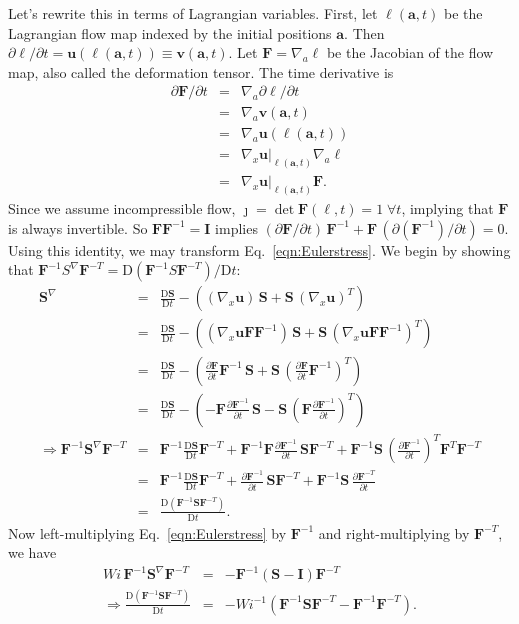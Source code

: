 \documentclass[12pt]{article}
\newcommand{\baas}[1]{\begin{eqnarray*} #1 \end{eqnarray*}}
\newcommand{\pd}[2]{\ensuremath{\frac{\partial #1}{\partial #2}}}
\newcommand{\ba}{{\mathbf a}}
\newcommand{\bl}{{\pmb \ell}}
\newcommand{\bu}{{\mathbf u}}
\newcommand{\bv}{{\mathbf v}}
\newcommand{\bS}{{\mathbf S}}
\newcommand{\bI}{{\mathbf I}}
\newcommand{\bF}{{\mathbf F}}
\begin{document}
	Let's rewrite this in terms of Lagrangian variables. First, let $\bl(\ba,t)$ be the Lagrangian flow map indexed by the initial positions $\ba$. Then $\partial\bl/\partial t=\bu(\bl(\ba,t)) \equiv \bv(\ba,t)$. Let $\bF = \nabla_a \bl$ be the Jacobian of the flow map, also called the deformation tensor. The time derivative is 
	\baas{
	\partial \bF/\partial t &=& \nabla_a \partial\bl/\partial t \\
	&=& \nabla_a \bv(\ba,t) \\
	&=& \nabla_a \bu(\bl(\ba,t)) \\
	&=& \nabla_x \bu \big\vert_{\bl(\ba,t)} \nabla_a \bl \\
	&=& \nabla_x \bu \big\vert_{\bl(\ba,t)} \bF.
	}
	Since we assume incompressible flow, $\jmath = \det \bF(\bl,t) = 1 \; \forall t$, implying that $\bF$ is always invertible. So $\bF\bF^{-1} = \bI$ implies $(\partial\bF/\partial t) \,\bF^{-1} + \bF\,(\partial\left( \bF^{-1}\right)/\partial t )= 0$. Using this identity, we may transform Eq.~\eqref{eqn:Eulerstress}. We begin by showing that $\bF^{-1}S^\nabla\bF^{-T} = \text{D}(\bF^{-1}S\bF^{-T})/\text{D} t$:
	\baas{
	\bS^\nabla &=& \frac{\text{D} \bS}{\text{D}t} - \left((\nabla_x\bu)\,\bS + \bS\,(\nabla_x\bu)^T \right) \\
	&=& \frac{\text{D} \bS}{\text{D}t} - \left((\nabla_x\bu\bF\bF^{-1})\,\bS + \bS\,(\nabla_x\bu\bF\bF^{-1})^T \right) \\
	&=& \frac{\text{D} \bS}{\text{D}t} - \left(\pd{\bF}{t}\bF^{-1}\,\bS + \bS\,\left(\pd{\bF}{t}\bF^{-1}\right)^T \right) \\
	&=& \frac{\text{D} \bS}{\text{D}t} - \left(-\bF\pd{\bF^{-1}}{t}\,\bS - \bS\,\left(\bF\pd{\bF^{-1}}{t}\right)^T \right)  \\
	\Rightarrow \bF^{-1}\bS^\nabla\bF^{-T} &=& \bF^{-1}\frac{\text{D} \bS}{\text{D}t}\bF^{-T} + \bF^{-1}\bF\pd{\bF^{-1}}{t}\,\bS\bF^{-T} + \bF^{-1}\bS\,\left(\pd {\bF^{-1}}{t}\right)^T \bF^T \bF^{-T} \\
	 &=& \bF^{-1}\frac{\text{D} \bS}{\text{D}t}\bF^{-T} + \pd {\bF^{-1}}{t}\,\bS\bF^{-T} + \bF^{-1}\bS\,\pd {\bF^{-T}}{t} \\
	&=& \frac{\text{D}\left(\bF^{-1}\bS\bF^{-T}\right)}{\text{D} t}.
	}
	Now left-multiplying Eq.~\eqref{eqn:Eulerstress} by $\bF^{-1}$ and right-multiplying by $\bF^{-T}$, we have
	\baas{
	Wi\,\bF^{-1}\bS^\nabla\bF^{-T} &=& -\bF^{-1}\left( \bS - \bI \right)\bF^{-T} \\
	\Rightarrow \frac{\text{D}\left(\bF^{-1}\bS\bF^{-T}\right)}{\text{D} t} &=& -Wi^{-1}\left( \bF^{-1}\bS\bF^{-T} - \bF^{-1}\bF^{-T} \right).
	}
\end{document}
